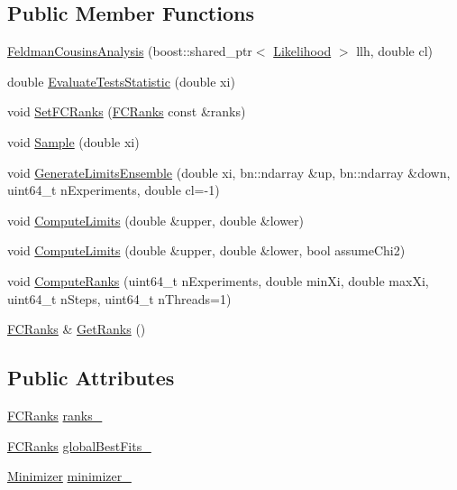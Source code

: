 \subsection*{Public Member Functions}
\begin{DoxyCompactItemize}
\item 
\hyperlink{classFeldmanCousinsAnalysis_a5b2fbad9a24678ba86f0f5b082a5b726}{Feldman\-Cousins\-Analysis} (boost\-::shared\-\_\-ptr$<$ \hyperlink{classLikelihood}{Likelihood} $>$ llh, double cl)
\item 
double \hyperlink{classFeldmanCousinsAnalysis_a090ca9e45d445fed42345d0a71a589bd}{Evaluate\-Tests\-Statistic} (double xi)
\item 
void \hyperlink{classFeldmanCousinsAnalysis_a5761bf4e0cd5968add070215988517ca}{Set\-F\-C\-Ranks} (\hyperlink{classFCRanks}{F\-C\-Ranks} const \&ranks)
\item 
void \hyperlink{classFeldmanCousinsAnalysis_a0f56a30ad2ec38520aa562fbea7f41cf}{Sample} (double xi)
\item 
void \hyperlink{classFeldmanCousinsAnalysis_a2455d8b563e2f243f02c76d61bf10573}{Generate\-Limits\-Ensemble} (double xi, bn\-::ndarray \&up, bn\-::ndarray \&down, uint64\-\_\-t n\-Experiments, double cl=-\/1)
\item 
void \hyperlink{classFeldmanCousinsAnalysis_ab6d8e4b65fa29c30e248f5e022c28dde}{Compute\-Limits} (double \&upper, double \&lower)
\item 
void \hyperlink{classFeldmanCousinsAnalysis_a0ed46c186508934d827e5fefef53be38}{Compute\-Limits} (double \&upper, double \&lower, bool assume\-Chi2)
\item 
void \hyperlink{classFeldmanCousinsAnalysis_a65c0fb42d70bf0a72b36261cde2ac095}{Compute\-Ranks} (uint64\-\_\-t n\-Experiments, double min\-Xi, double max\-Xi, uint64\-\_\-t n\-Steps, uint64\-\_\-t n\-Threads=1)
\item 
\hyperlink{classFCRanks}{F\-C\-Ranks} \& \hyperlink{classFeldmanCousinsAnalysis_a369111f301236a55ef19aeb7ac0d9562}{Get\-Ranks} ()
\end{DoxyCompactItemize}
\subsection*{Public Attributes}
\begin{DoxyCompactItemize}
\item 
\hyperlink{classFCRanks}{F\-C\-Ranks} \hyperlink{classFeldmanCousinsAnalysis_a2a83aefd21bd62772ba9b8ef2a0afe37}{ranks\-\_\-}
\item 
\hyperlink{classFCRanks}{F\-C\-Ranks} \hyperlink{classFeldmanCousinsAnalysis_a41ab3fd253179cd5fa77b651d4514fdc}{global\-Best\-Fits\-\_\-}
\item 
\hyperlink{classMinimizer}{Minimizer} \hyperlink{classFeldmanCousinsAnalysis_a4a16f04a45c379c10b12f76714116226}{minimizer\-\_\-}
\end{DoxyCompactItemize}


